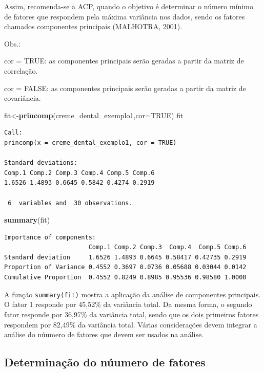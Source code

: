 \documentclass[12pt,brazil,oneside]{book}
\newenvironment{Shaded}{\begin{snugshade}}{\end{snugshade}}
\newcommand{\DataTypeTok}[1]{\textcolor[rgb]{0.13,0.29,0.53}{#1}}
\newcommand{\KeywordTok}[1]{\textcolor[rgb]{0.13,0.29,0.53}{\textbf{#1}}}
\newcommand{\NormalTok}[1]{#1}
\newcommand{\OtherTok}[1]{\textcolor[rgb]{0.56,0.35,0.01}{#1}}
\begin{document}
Assim, recomenda-se a ACP, quando o objetivo é determinar o número
mínimo de fatores que respondem pela máxima variância nos dados, sendo
os fatores chamados componentes principais (MALHOTRA, 2001).

Obs.:

cor = TRUE: as componentes principais serão geradas a partir da matriz
de correlação.

cor = FALSE: as componentes principais serão geradas a partir da matriz
de covariância.

\begin{Shaded}
\begin{Highlighting}[]
\NormalTok{fit<-}\KeywordTok{princomp}\NormalTok{(creme_dental_exemplo1,}\DataTypeTok{cor=}\OtherTok{TRUE}\NormalTok{)}
\NormalTok{fit}
\end{Highlighting}
\end{Shaded}

\begin{verbatim}
Call:
princomp(x = creme_dental_exemplo1, cor = TRUE)

Standard deviations:
Comp.1 Comp.2 Comp.3 Comp.4 Comp.5 Comp.6 
1.6526 1.4893 0.6645 0.5842 0.4274 0.2919 

 6  variables and  30 observations.
\end{verbatim}

\begin{Shaded}
\begin{Highlighting}[]
\KeywordTok{summary}\NormalTok{(fit)}
\end{Highlighting}
\end{Shaded}

\begin{verbatim}
Importance of components:
                       Comp.1 Comp.2 Comp.3  Comp.4  Comp.5 Comp.6
Standard deviation     1.6526 1.4893 0.6645 0.58417 0.42735 0.2919
Proportion of Variance 0.4552 0.3697 0.0736 0.05688 0.03044 0.0142
Cumulative Proportion  0.4552 0.8249 0.8985 0.95536 0.98580 1.0000
\end{verbatim}

A função \texttt{summary(fit)} mostra a aplicação da análise de
componentes principais. O fator 1 responde por 45,52\% da variância
total. Da mesma forma, o segundo fator responde por 36,97\% da variância
total, sendo que os dois primeiros fatores respondem por 82,49\% da
variância total. Várias considerações devem integrar a análise do
núumero de fatores que devem ser usados na análise.

\hypertarget{determinacao-do-nuumero-de-fatores}{%
\subsection{Determinação do núumero de
fatores}\label{determinacao-do-nuumero-de-fatores}}
\end{document}
